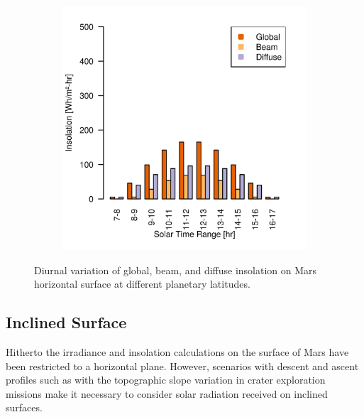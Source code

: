 \begin{figure}[h]
\begin{subfigure}[t]{\subfigureWidth}
  		\label{fig:sub:insolation-phi-0}
  	\end{subfigure}\hfill
	   \begin{subfigure}[t]{\subfigureWidth}
      \centering
  		\includegraphics[height=\graphicsHeight]{sections/martian-environment/plots/ih-ibh-and-idh-variation-4-for-ls-71-phi-40-tau-05-and-albedo-027}
  		\label{fig:sub:insolation-phi-p20}
	   \end{subfigure}\hfill
	\caption{Diurnal variation of global, beam, and diffuse insolation on Mars horizontal surface at different planetary latitudes.}
	\label{fig:plot:insolation-phi}
\vspace{-2ex}
\end{figure}

\clearpage
\subsection{Inclined Surface}
\label{sec:MartianEnvironment:SolarRadiation:InclinedSurface}

Hitherto the irradiance and insolation calculations on the surface of Mars have been restricted to a horizontal plane. However, scenarios with descent and ascent profiles such as with the topographic slope variation in crater exploration missions make it necessary to consider solar radiation received on inclined surfaces.

